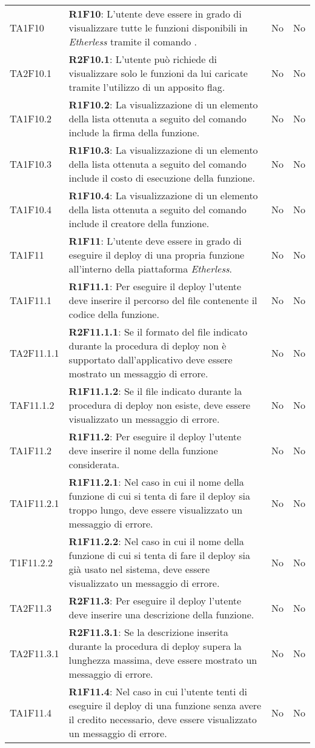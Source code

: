 \begin{longtable}{ 
		>{\centering}p{} 
		>{}p{} 
		>{\centering}p{}
		>{\centering}p{} }
	TA1F10 		& \textbf{R1F10}: L'utente deve essere in grado di visualizzare tutte le funzioni disponibili in \textit{Etherless} tramite il comando \lista{}. 										& No & No \tabularnewline
	TA2F10.1 	& \textbf{R2F10.1}: L'utente può richiede di visualizzare solo le funzioni da lui caricate tramite l'utilizzo di un apposito flag.															& No & No \tabularnewline
	TA1F10.2 	& \textbf{R1F10.2}: La visualizzazione di un elemento della lista ottenuta a seguito del comando \lista{} include la firma della funzione. 												& No & No \tabularnewline
	TA1F10.3 	& \textbf{R1F10.3}: La visualizzazione di un elemento della lista ottenuta a seguito del comando \lista{} include il costo di esecuzione della funzione. 									& No & No \tabularnewline
	TA1F10.4		& \textbf{R1F10.4}: La visualizzazione di un elemento della lista ottenuta a seguito del comando \lista{} include il creatore della funzione. 												& No & No \tabularnewline
	
	TA1F11 		& \textbf{R1F11}: L'utente deve essere in grado di eseguire il deploy\ped{\textit{G}} di una propria funzione all'interno della piattaforma \textit{Etherless}. 							& No & No \tabularnewline
	TA1F11.1 	& \textbf{R1F11.1}: Per eseguire il deploy\ped{\textit{G}} l'utente deve inserire il percorso del file contenente il codice della funzione. 												& No & No \tabularnewline
	TA2F11.1.1 	& \textbf{R2F11.1.1}: Se il formato del file indicato durante la procedura di deploy\ped{\textit{G}} non è supportato dall'applicativo deve essere mostrato un messaggio di errore.			& No & No \tabularnewline
	TAF11.1.2 	& \textbf{R1F11.1.2}: Se il file indicato durante la procedura di deploy\ped{\textit{G}} non esiste, deve essere visualizzato un messaggio di errore.										& No & No \tabularnewline
	TA1F11.2 	& \textbf{R1F11.2}: Per eseguire il deploy\ped{\textit{G}} l'utente deve inserire il nome della funzione considerata. 																		& No & No \tabularnewline
	TA1F11.2.1 	& \textbf{R1F11.2.1}: Nel caso in cui il nome della funzione di cui si tenta di fare il deploy\ped{\textit{G}} sia troppo lungo, deve essere visualizzato un messaggio di errore. 			& No & No \tabularnewline
	T1F11.2.2 	& \textbf{R1F11.2.2}: Nel caso in cui il nome della funzione di cui si tenta di fare il deploy\ped{\textit{G}} sia già usato nel sistema, deve essere visualizzato un messaggio di errore.	& No & No \tabularnewline
	TA2F11.3 	& \textbf{R2F11.3}: Per eseguire il deploy\ped{\textit{G}} l'utente deve inserire una descrizione della funzione. 																			& No & No \tabularnewline
	TA2F11.3.1 	& \textbf{R2F11.3.1}: Se la descrizione inserita durante la procedura di deploy\ped{\textit{G}} supera la lunghezza massima, deve essere mostrato un messaggio di errore. 					& No & No \tabularnewline
	TA1F11.4 	& \textbf{R1F11.4}: Nel caso in cui l'utente tenti di eseguire il deploy\ped{\textit{G}} di una funzione senza avere il credito necessario, deve essere visualizzato un messaggio di errore. & No & No \tabularnewline
	

\end{longtable}
